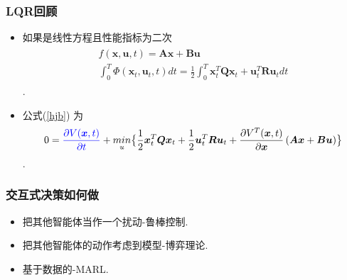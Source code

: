 \documentclass[UTF8, aspectratio=169, 9pt]{ctexbeamer}
\begin{document}
\begin{frame}
  \frametitle{LQR回顾}
  \begin{itemize}
  \item 如果是线性方程且性能指标为二次
    \begin{align}
      \begin{split}
        f( \boldsymbol{x}, \boldsymbol{u}, t ) = \boldsymbol{A x} +
        \boldsymbol{B u} \\
        \int_0^T \Phi ( \boldsymbol{x}_t,  \boldsymbol{u}_t, t ) dt  =
        \frac{1}{2} \int_0^T \boldsymbol{x}^T_t \boldsymbol{Q} \boldsymbol{x}_t
        + \boldsymbol{u}^T_t \boldsymbol{R} \boldsymbol{u}_t dt
      \end{split}
    \end{align}.
  \item 公式(\ref{hjb}) 为
      \begin{align}
      \label{linear-hjb}
      0 = \textcolor{blue} { \frac{ \partial V
      ( \boldsymbol{x}, t )}{ \partial t } }  +
      \underset{u}{min} \big \{
        \frac{1}{2}  \boldsymbol{x}^T_t \boldsymbol{Q} \boldsymbol{x}_t
        + \frac{1}{2} \boldsymbol{u}^T_t \boldsymbol{R} \boldsymbol{u}_t
        + \frac{
      \partial V^T ( \boldsymbol{x}, t  ) } { \partial
      \boldsymbol{x}  } \, ( \boldsymbol{A x} +
        \boldsymbol{B u} )
      \big \}
    \end{align}.

  \end{itemize}
\end{frame}

\begin{frame}
  \frametitle{交互式决策如何做}
  \begin{itemize}
  \item 把其他智能体当作一个扰动-鲁棒控制.
  \item 把其他智能体的动作考虑到模型-博弈理论.
  \item 基于数据的-MARL.
  \end{itemize}
\end{frame}
\end{document}
